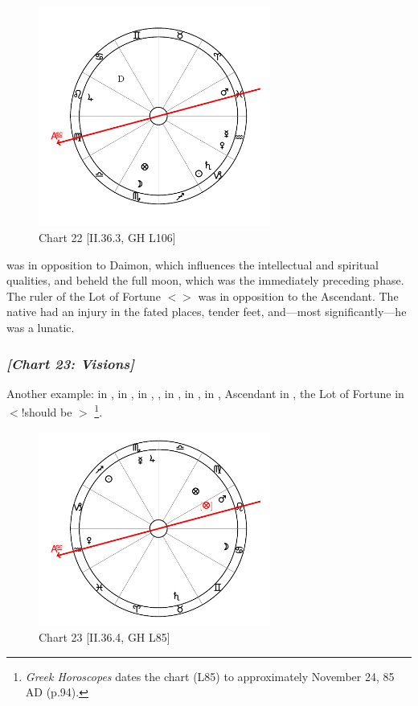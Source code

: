 \clearpage
\begin{figure}
\centering
\vspace{-30pt}
\includegraphics[width=0.68\textwidth]{charts/2_36_3}
\caption{Chart 22 [II.36.3, GH L106]}
\label{fig:chart22}
\end{figure}

\noindent \Saturn was in opposition to Daimon, which influences the intellectual and spiritual qualities, and \Saturn\xspace beheld the full moon, which was the immediately preceding phase. The ruler of the Lot of Fortune $<$\Mars$>$ was in opposition to the Ascendant. The native had an injury in the fated places, tender feet, and—most significantly—he was a lunatic. 

\newpage
\subsubsection{\textit{[Chart 23: Visions]}}
Another example: \Sun\xspace in \Sagittarius, \Moon\xspace in \Cancer, \Saturn\xspace in \Taurus, \Jupiter, \Mercury\xspace in \Scorpio, \Mars\xspace in \Leo, \Venus\xspace in \Capricorn, Ascendant in \Aquarius, the Lot of Fortune in \Leo $<$!should be \Virgo$>$
\footnote{\textit{Greek Horoscopes} dates the chart (L85) to approximately November 24, 85 AD (p.94).}.

\clearpage
\begin{figure}
\centering
\vspace{-20pt}
\includegraphics[width=0.68\textwidth]{charts/2_36_4}
\caption{Chart 23 [II.36.4, GH L85]}
\label{fig:chart23}
\end{figure}

